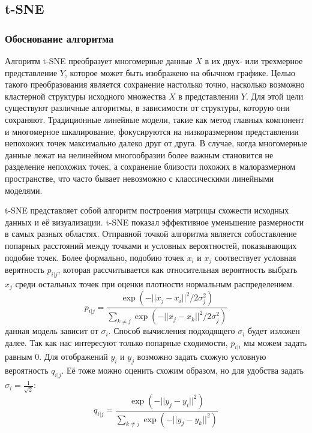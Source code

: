 \subsection{t-SNE}

\subsubsection{Обоснование алгоритма}

Алгоритм t-SNE преобразует многомерные данные $X$ в их двух- или трехмерное представление $Y$, которое может быть изображено на обычном графике. Целью такого преобразования является сохранение настолько точно, насколько возможно кластерной структуры исходного множества $X$ в представлении $Y$. Для этой цели существуют различные алгоритмы, в зависимости от структуры, которую они сохраняют. Традиционные линейные модели, такие как метод главных компонент и многомерное шкалирование, фокусируются на низкоразмерном представлении непохожих точек максимально далеко друг от друга. В случае, когда многомерные данные лежат на нелинейном многообразии более важным становится не разделение непохожих точек, а сохранение близости похожих в малоразмерном пространстве, что часто бывает невозможно с классическими линейными моделями.

t-SNE представляет собой алгоритм построения матрицы схожести исходных данных и её визуализации. t-SNE показал эффективное уменьшение размерности в самых разных областях. Отправной точкой алгоритма является собоставление попарных расстояний между точками и условных вероятностей, показывающих подобие точек. Более формально, подобию точек $x_i$ и $x_j$ соотвествует условная верятность $p_{i|j}$, которая рассчитывается как относительная вероятность выбрать $x_j$ среди остальных точек при оценки плотности нормальным распределением. 
\begin{equation}
	p_{i|j} = \frac{\exp(-||x_j - x_i||^2 / 2 \sigma_j^2)}{\sum_{k \neq j}\exp(-||x_j - x_k||^2 / 2 \sigma_j^2)}
\end{equation}
данная модель зависит от $\sigma_i$. Способ вычисления подходящего $\sigma_i$ будет изложен далее. Так как нас интересуют только попарные сходимости, $p_{i|i}$ мы можем задать равным 0. Для отображений $y_i$ и $y_j$ возможно задать схожую условную вероятность $q_{i|j}$. Её тоже можно оценить схожим образом, но для удобства задать $\sigma_i = \frac{1}{\sqrt{2}}$:
\begin{equation}
		q_{i|j} = \frac{\exp(-||y_j - y_i||^2)}{\sum_{k \neq j}\exp(-||y_j - y_k||^2)}
\end{equation}

